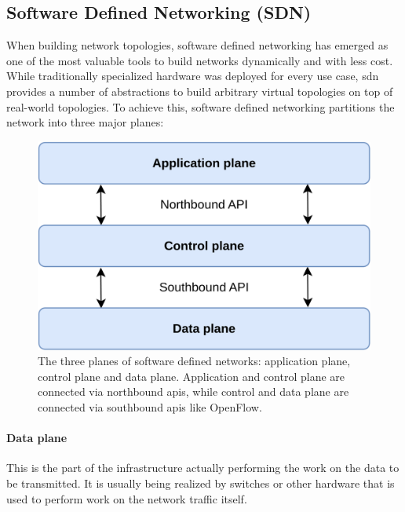 \subsection{Software Defined Networking (SDN)}
When building network topologies, software defined networking \cite{sdn} has emerged as one of the most valuable tools to build networks dynamically and with less cost.
While traditionally specialized hardware was deployed for every use case, \acrshort{sdn} provides a number of abstractions to build arbitrary virtual topologies on top of real-world topologies.
To achieve this, software defined networking partitions the network into three major planes:

\begin{figure}[h]
  \centering
  \includegraphics[width=\linewidth]{images/chapter_2/sdn.png}
  \caption[Software defined networking (\acrshort{sdn})]{The three planes of software defined networks: application plane, control plane and data plane. Application and control plane are connected via northbound \acrshort{api}s, while control and data plane are connected via southbound \acrshort{api}s like OpenFlow.}
  \label{fig:sdn}
\end{figure}

\paragraph{Data plane} This is the part of the infrastructure actually performing the work on the data to be transmitted. It is usually being realized by switches or other hardware that is used to perform work on the network traffic itself.

